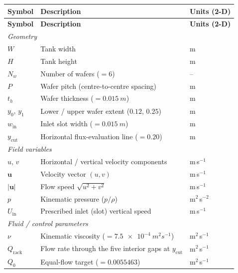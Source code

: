 \documentclass[11pt]{article}
\begin{document}
\renewcommand{\arraystretch}{1.25}
\begin{longtable}{p{} p{} p{}}
\toprule
\textbf{Symbol} & \textbf{Description} & \textbf{Units (2-D)} \\
\midrule
\endfirsthead
\toprule
\textbf{Symbol} & \textbf{Description} & \textbf{Units (2-D)} \\
\midrule
\endhead
\multicolumn{3}{l}{\emph{Geometry}}\\
$W$            & Tank width                                              & m \\
$H$            & Tank height                                             & m \\
$N_w$          & Number of wafers ($=6$)                                 & -- \\
$P$            & Wafer pitch (centre-to-centre spacing)                  & m \\
$t_h$          & Wafer thickness ($=\SI{0.015}{m}$)                      & m \\
$y_0,\,y_1$    & Lower / upper wafer extent ($0.12,\,0.25$)              & m \\
$w_\mathrm{in}$& Inlet slot width ($=\SI{0.015}{m}$)                     & m \\
$y_\mathrm{cut}$& Horizontal flux-evaluation line ($=0.20$)              & m \\[4pt]
\multicolumn{3}{l}{\emph{Field variables}}\\
$u,\,v$        & Horizontal / vertical velocity components               & m\,s$^{-1}$ \\
$\mathbf{u}$   & Velocity vector $(u,v)$                                 & m\,s$^{-1}$ \\
$|\mathbf{u}|$ & Flow speed $\sqrt{u^2+v^2}$                             & m\,s$^{-1}$ \\
$p$            & Kinematic pressure ($p/\rho$)                           & m$^2$\,s$^{-2}$ \\
$U_\mathrm{in}$& Prescribed inlet (slot) vertical speed                  & m\,s$^{-1}$ \\[4pt]
\multicolumn{3}{l}{\emph{Fluid / control parameters}}\\
$\nu$          & Kinematic viscosity ($=\SI{7.5e-4}{m^2 s^{-1}}$)        & m$^2$\,s$^{-1}$ \\
$Q_\mathrm{rack}$ & Flow rate through the five interior gaps at $y_\mathrm{cut}$ & m$^2$\,s$^{-1}$ \\
$Q_0$          & Equal-flow target ($=0.0055463$)                        & m$^2$\,s$^{-1}$ \\

\end{longtable}
\end{document}
